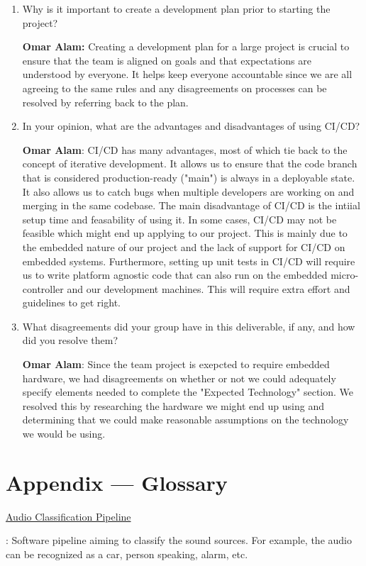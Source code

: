 \documentclass{article}
\begin{document}
\begin{enumerate}
    \item Why is it important to create a development plan prior to starting the
    project?

    \textbf{Omar Alam:} Creating a development plan for a large project is crucial to ensure that the team is aligned on goals
    and that expectations are understood by everyone. It helps keep everyone accountable since we are all agreeing to the same rules
    and any disagreements on processes can be resolved by referring back to the plan.
    \item In your opinion, what are the advantages and disadvantages of using
    CI/CD?

    \textbf{Omar Alam}: CI/CD has many advantages, most of which tie back to the concept of iterative development. It allows us to ensure
    that the code branch that is considered production-ready ("main") is always in a deployable state. It also allows us to catch bugs when multiple 
    developers are working on and merging in the same codebase. The main disadvantage of CI/CD is the intiial setup time and feasability of using it.
    In some cases, CI/CD may not be feasible which might end up applying to our project. This is mainly due to the embedded nature of our project 
    and the lack of support for CI/CD on embedded systems. Furthermore, setting up unit tests in CI/CD will require us to write platform agnostic
    code that can also run on the embedded micro-controller and our development machines. This will require extra effort and guidelines to get right.
    \item What disagreements did your group have in this deliverable, if any,
    and how did you resolve them?

    \textbf{Omar Alam}: Since the team project is exepcted to require embedded hardware, we had disagreements on whether or not we could adequately
    specify elements needed to complete the "Expected Technology" section. We resolved this by researching the hardware we might end up using and 
    determining that we could make reasonable assumptions on the technology we would be using.
\end{enumerate}

\newpage{}

\section*{Appendix --- Glossary}


\hypertarget{audio_classification_pipeline}{\underline{Audio Classification Pipeline}}: 
Software pipeline aiming to classify the sound sources.
For example, the audio can be recognized as a car, person speaking, alarm, etc.
\end{document}
